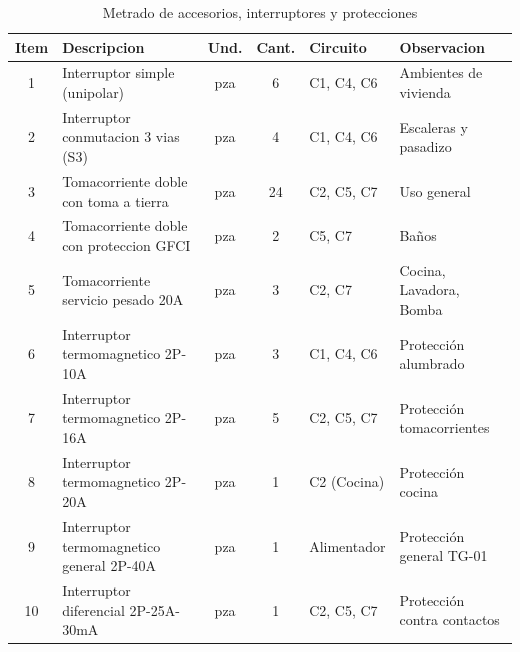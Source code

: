\begin{table}[H]
\centering
\small
\setlength{\tabcolsep}{5pt}
\caption{Metrado de accesorios, interruptores y protecciones}
\label{tab:metrado-accesorios}
\begin{tabularx}{\textwidth}{c L{4.2cm} c c L{1.8cm} Y}
\toprule
\textbf{Item} & \textbf{Descripcion} & \textbf{Und.} & \textbf{Cant.} & \textbf{Circuito} & \textbf{Observacion} \\
 & Interruptor simple (unipolar) & pza & 6 & C1, C4, C6 & Ambientes de vivienda \\
2 & Interruptor conmutacion 3 vias (S3) & pza & 4 & C1, C4, C6 & Escaleras y pasadizo \\
3 & Tomacorriente doble con toma a tierra & pza & 24 & C2, C5, C7 & Uso general \\
4 & Tomacorriente doble con proteccion GFCI & pza & 2 & C5, C7 & Baños \\
5 & Tomacorriente servicio pesado 20A & pza & 3 & C2, C7 & Cocina, Lavadora, Bomba \\
6 & Interruptor termomagnetico 2P-10A & pza & 3 & C1, C4, C6 & Protección alumbrado \\
7 & Interruptor termomagnetico 2P-16A & pza & 5 & C2, C5, C7 & Protección tomacorrientes \\
8 & Interruptor termomagnetico 2P-20A & pza & 1 & C2 (Cocina) & Protección cocina \\
9 & Interruptor termomagnetico general 2P-40A & pza & 1 & Alimentador & Protección general TG-01 \\
10 & Interruptor diferencial 2P-25A-30mA & pza & 1 & C2, C5, C7 & Protección contra contactos \\
\bottomrule
\end{tabularx}
\end{table}
